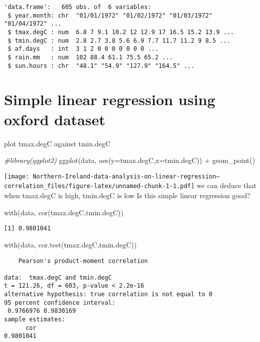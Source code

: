 \documentclass[
]{article}
\newenvironment{Shaded}{\begin{snugshade}}{\end{snugshade}}
\newcommand{\AttributeTok}[1]{\textcolor[rgb]{0.77,0.63,0.00}{#1}}
\newcommand{\CommentTok}[1]{\textcolor[rgb]{0.56,0.35,0.01}{\textit{#1}}}
\newcommand{\FunctionTok}[1]{\textcolor[rgb]{0.00,0.00,0.00}{#1}}
\newcommand{\NormalTok}[1]{#1}
\newcommand{\SpecialCharTok}[1]{\textcolor[rgb]{0.00,0.00,0.00}{#1}}
\begin{document}
\begin{verbatim}
'data.frame':   605 obs. of  6 variables:
 $ year.month: chr  "01/01/1972" "01/02/1972" "01/03/1972" "01/04/1972" ...
 $ tmax.degC : num  6.8 7 9.1 10.2 12 12.9 17 16.5 15.2 13.9 ...
 $ tmin.degC : num  2.8 2.7 3.8 5.6 6.9 7.7 11.7 11.2 9 8.5 ...
 $ af.days   : int  3 1 2 0 0 0 0 0 0 0 ...
 $ rain.mm   : num  102 88.4 61.1 75.5 65.2 ...
 $ sun.hours : chr  "48.1" "54.9" "127.9" "164.5" ...
\end{verbatim}

\hypertarget{simple-linear-regression-using-oxford-dataset}{%
\section{Simple linear regression using oxford
dataset}\label{simple-linear-regression-using-oxford-dataset}}

plot tmax.degC against tmin.degC

\begin{Shaded}
\begin{Highlighting}[]
\CommentTok{\#library(ggplot2)}
\FunctionTok{ggplot}\NormalTok{(data, }\FunctionTok{aes}\NormalTok{(}\AttributeTok{y=}\NormalTok{tmax.degC,}\AttributeTok{x=}\NormalTok{tmin.degC)) }\SpecialCharTok{+}
  \FunctionTok{geom\_point}\NormalTok{()}
\end{Highlighting}
\end{Shaded}

\texttt{[image: Northern-Ireland-data-analysis-on-linear-regression---correlation\_files/figure-latex/unnamed-chunk-1-1.pdf]}
we can deduce that when tmax.degC is high, tmin.degC is low Is this
simple linear regression good?

\begin{Shaded}
\begin{Highlighting}[]
\FunctionTok{with}\NormalTok{(data, }\FunctionTok{cor}\NormalTok{(tmax.degC,tmin.degC))}
\end{Highlighting}
\end{Shaded}

\begin{verbatim}
[1] 0.9801041
\end{verbatim}

\begin{Shaded}
\begin{Highlighting}[]
\FunctionTok{with}\NormalTok{(data, }\FunctionTok{cor.test}\NormalTok{(tmax.degC,tmin.degC))}
\end{Highlighting}
\end{Shaded}

\begin{verbatim}
    Pearson's product-moment correlation

data:  tmax.degC and tmin.degC
t = 121.26, df = 603, p-value < 2.2e-16
alternative hypothesis: true correlation is not equal to 0
95 percent confidence interval:
 0.9766976 0.9830169
sample estimates:
      cor 
0.9801041 
\end{verbatim}
\end{document}
